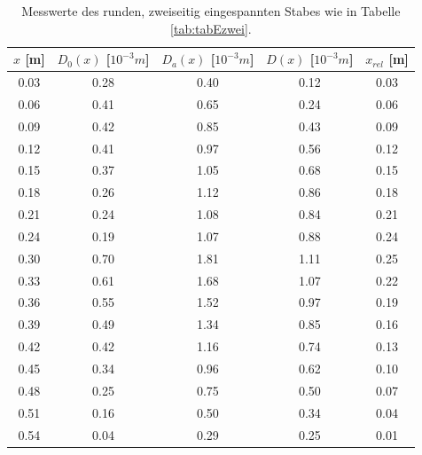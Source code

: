 \documentclass[titlepage = firstcover]{scrartcl}
\begin{document}
      \begin{table}[h]
        \centering
        \caption{Messwerte des runden, zweiseitig eingespannten Stabes wie in Tabelle \ref{tab:tabEzwei}.}
        \label{tab:tabRzwei}
        \begin{tabular}{c c c c c}
          \toprule
          {$x$ [m]} & {$D_0(x)$ [$10^{-3}m$]} & {$D_a(x)$ [$10^{-3}m$]} & {$D(x)$ [$10^{-3}m$]} & {$x_{rel}$ [m]}\\
          \midrule
          0.03 & 0.28 & 0.40 & 0.12 & 0.03\\
          0.06 & 0.41 & 0.65 & 0.24 & 0.06\\
          0.09 & 0.42 & 0.85 & 0.43 & 0.09\\
          0.12 & 0.41 & 0.97 & 0.56 & 0.12\\
          0.15 & 0.37 & 1.05 & 0.68 & 0.15\\
          0.18 & 0.26 & 1.12 & 0.86 & 0.18\\
          0.21 & 0.24 & 1.08 & 0.84 & 0.21\\
          0.24 & 0.19 & 1.07 & 0.88 & 0.24\\
          0.30 & 0.70 & 1.81 & 1.11 & 0.25\\
          0.33 & 0.61 & 1.68 & 1.07 & 0.22\\
          0.36 & 0.55 & 1.52 & 0.97 & 0.19\\
          0.39 & 0.49 & 1.34 & 0.85 & 0.16\\
          0.42 & 0.42 & 1.16 & 0.74 & 0.13\\
          0.45 & 0.34 & 0.96 & 0.62 & 0.10\\
          0.48 & 0.25 & 0.75 & 0.50 & 0.07\\
          0.51 & 0.16 & 0.50 & 0.34 & 0.04\\
          0.54 & 0.04 & 0.29 & 0.25 & 0.01\\
          \bottomrule            
        \end{tabular}
      \end{table}
\end{document}

